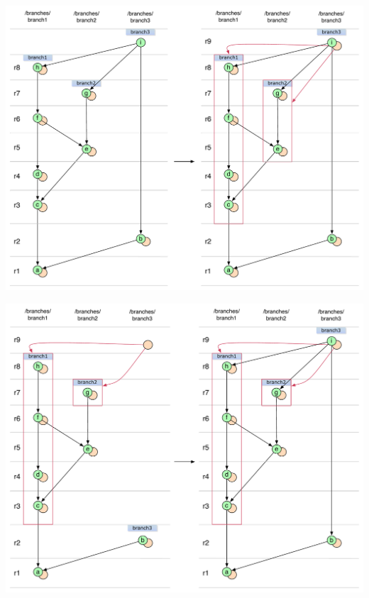 \begin{center}
\includegraphics[width=\textwidth]{img/diagrams/octopus_merge_git_to_svn.pdf}%
\label{octopus_merge_git_to_svn}%
\end{center}

\begin{center}
\includegraphics[width=\textwidth]{img/diagrams/octopus_merge_svn_to_git.pdf}%
\label{octopus_merge_svn_to_git}%
\end{center}
